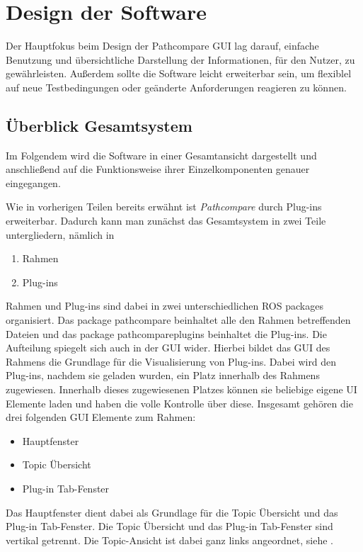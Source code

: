 \section{Design der Software}
Der Hauptfokus beim Design der Pathcompare GUI lag darauf, einfache Benutzung und
übersichtliche Darstellung der Informationen, für den Nutzer, zu gewährleisten.
Außerdem sollte die Software leicht erweiterbar sein, um flexiblel auf neue
Testbedingungen oder geänderte Anforderungen reagieren zu können.

\subsection{Überblick Gesamtsystem}

Im Folgendem wird die Software in einer Gesamtansicht dargestellt und
anschließend auf die Funktionsweise ihrer Einzelkomponenten genauer eingegangen.

Wie in vorherigen Teilen bereits erwähnt ist \textit{Pathcompare} durch
Plug-ins erweiterbar. Dadurch kann man zunächst das Gesamtsystem in zwei Teile
untergliedern, nämlich in 

\begin{enumerate}
  \item Rahmen
  \item Plug-ins
\end{enumerate}

Rahmen und Plug-ins sind dabei in zwei unterschiedlichen ROS packages
organisiert. Das package pathcompare beinhaltet alle den Rahmen betreffenden
Dateien und das package pathcompareplugins beinhaltet die Plug-ins.
Die Aufteilung spiegelt sich auch in der GUI wider.
Hierbei bildet das GUI des Rahmens die Grundlage für die Visualisierung von Plug-ins.
Dabei wird den Plug-ins, nachdem sie geladen wurden, ein Platz innerhalb des
Rahmens zugewiesen. Innerhalb dieses zugewiesenen Platzes können sie beliebige
eigene UI Elemente laden und haben die volle Kontrolle über diese. Insgesamt
gehören die drei folgenden GUI Elemente zum Rahmen:

\begin{itemize}
\item Hauptfenster
\item Topic Übersicht
\item Plug-in Tab-Fenster
\end{itemize}

Das Hauptfenster dient dabei als Grundlage für die Topic Übersicht und das
Plug-in Tab-Fenster. Die Topic Übersicht und das Plug-in Tab-Fenster sind vertikal
getrennt. Die Topic-Ansicht ist dabei ganz links angeordnet, siehe   .

